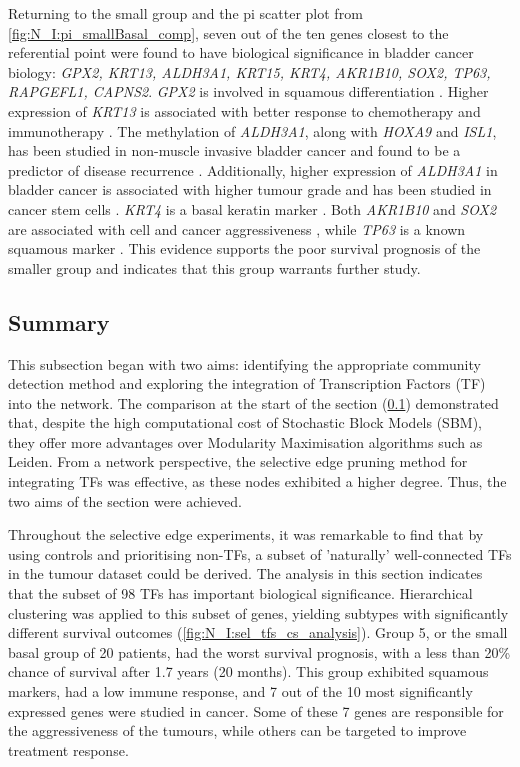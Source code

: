 Returning to the small group and the pi scatter plot from \cref{fig:N_I:pi_smallBasal_comp},
seven out of the ten genes closest to the referential point were found to have biological significance in bladder cancer biology: \textit{GPX2, KRT13, ALDH3A1, KRT15, KRT4, AKR1B10, SOX2, TP63, RAPGEFL1, CAPNS2}. \textit{GPX2} is involved in squamous differentiation \citet{Naiki2018-fp}. Higher expression of \textit{KRT13} is associated with better response to chemotherapy and immunotherapy \citet{Yu2023-db}. The methylation of \textit{ALDH3A1}, along with \textit{HOXA9} and \textit{ISL1}, has been studied in non-muscle invasive bladder cancer and found to be a predictor of disease recurrence \citet{McLean2023-qk}. Additionally, higher expression of \textit{ALDH3A1} in bladder cancer is associated with higher tumour grade and has been studied in cancer stem cells \citet{Kim2013-th}. \textit{KRT4} is a basal keratin marker \citet{Marzouka2018-ge}. Both \textit{AKR1B10} and \textit{SOX2} are associated with cell and cancer aggressiveness \citet{Huang2021-bn, Chiu2020-xh}, while \textit{TP63} is a known squamous marker \citet{Robertson2017-mg}. This evidence supports the poor survival prognosis of the smaller group and indicates that this group warrants further study.


\subsection{Summary}

This subsection began with two aims: identifying the appropriate community detection method and exploring the integration of Transcription Factors (TF) into the network. The comparison at the start of the section (\ref{}) demonstrated that, despite the high computational cost of Stochastic Block Models (SBM), they offer more advantages over Modularity Maximisation algorithms such as Leiden. From a network perspective, the selective edge pruning method for integrating TFs was effective, as these nodes exhibited a higher degree. Thus, the two aims of the section were achieved.

Throughout the selective edge experiments, it was remarkable to find that by using controls and prioritising non-TFs, a subset of 'naturally' well-connected TFs in the tumour dataset could be derived. The analysis in this section indicates that the subset of 98 TFs has important biological significance. Hierarchical clustering was applied to this subset of genes, yielding subtypes with significantly different survival outcomes (\cref{fig:N_I:sel_tfs_cs_analysis}). Group 5, or the small basal group of 20 patients, had the worst survival prognosis, with a less than 20\% chance of survival after 1.7 years (20 months). This group exhibited squamous markers, had a low immune response, and 7 out of the 10 most significantly expressed genes were studied in cancer. Some of these 7 genes are responsible for the aggressiveness of the tumours, while others can be targeted to improve treatment response.

